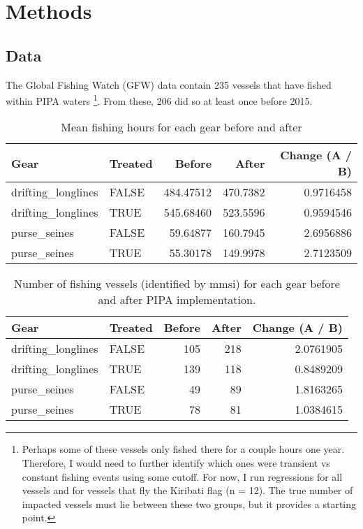 \documentclass[]{article}
\let\rmarkdownfootnote\footnote%
\def\footnote{\protect\rmarkdownfootnote}
\theoremstyle{definition}
\theoremstyle{definition}
\theoremstyle{definition}
\theoremstyle{remark}
\begin{document}
\section{Methods}\label{methods}

\subsection{Data}\label{data}

The Global Fishing Watch (GFW) data contain 235 vessels that have fished
within PIPA waters \footnote{Perhaps some of these vessels only fished
  there for a couple hours one year. Therefore, I would need to further
  identify which ones were transient vs constant fishing events using
  some cutoff. For now, I run regressions for all vessels and for
  vessels that fly the Kiribati flag (n = 12). The true number of
  impacted vessels must lie between these two groups, but it provides a
  starting point.}. From these, 206 did so at least once before 2015.

\begin{table}

\caption{\label{tab:unnamed-chunk-3}Mean fishing hours for each gear before and after}
\centering
\begin{tabular}[t]{l|l|r|r|r}
\hline
Gear & Treated & Before & After & Change (A / B)\\
\hline
drifting\_longlines & FALSE & 484.47512 & 470.7382 & 0.9716458\\
\hline
drifting\_longlines & TRUE & 545.68460 & 523.5596 & 0.9594546\\
\hline
purse\_seines & FALSE & 59.64877 & 160.7945 & 2.6956886\\
\hline
purse\_seines & TRUE & 55.30178 & 149.9978 & 2.7123509\\
\hline
\end{tabular}
\end{table}

\begin{table}

\caption{\label{tab:unnamed-chunk-4}Number of fishing vessels (identified by mmsi) for each gear before and after PIPA implementation.}
\centering
\begin{tabular}[t]{l|l|r|r|r}
\hline
Gear & Treated & Before & After & Change (A / B)\\
\hline
drifting\_longlines & FALSE & 105 & 218 & 2.0761905\\
\hline
drifting\_longlines & TRUE & 139 & 118 & 0.8489209\\
\hline
purse\_seines & FALSE & 49 & 89 & 1.8163265\\
\hline
purse\_seines & TRUE & 78 & 81 & 1.0384615\\
\hline
\end{tabular}
\end{table}
\end{document}
